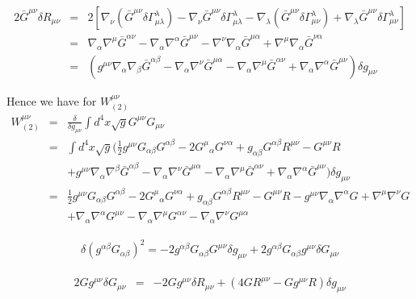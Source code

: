\documentclass[10pt,letterpaper]{article}
\numberwithin{equation}{section}
\begin{document}
\begin{appendices}
\begin{eqnarray}
2\bar G^{\mu\nu}\delta R_{\mu\nu} &=& 2 \left[ \nabla_\nu (\bar G^{\mu\nu}\delta \Gamma^\lambda_{\mu\lambda}) - \nabla_\nu \bar G^{\mu\nu} \delta \Gamma^\lambda_{\mu\lambda}
-\nabla_\lambda (\bar G^{\mu\nu}\delta \Gamma^\lambda_{\mu\nu}) + \nabla_\lambda \bar G^{\mu\nu} \delta \Gamma^\lambda_{\mu\nu}\right]
\nonumber\\
&=& \nabla_\alpha \nabla^\mu \bar G^{\alpha\nu} - \nabla_\alpha\nabla^\alpha \bar G^{\mu\nu}
-\nabla^\nu \nabla_\alpha \bar G^{\mu\alpha} + \nabla^\mu \nabla_\alpha \bar G^{\nu\alpha}
\nonumber\\
&=& \left( g^{\mu\nu} \nabla_\alpha\nabla_\beta \bar G^{\alpha\beta} - \nabla_\alpha \nabla^\nu \bar G^{\mu\alpha} - \nabla_\alpha \nabla^\mu \bar G^{\alpha\nu} + \nabla_\alpha\nabla^\alpha \bar G^{\mu\nu}\right)\delta g_{\mu\nu}
\end{eqnarray}

Hence we have for $W_{(2)}^{\mu\nu}$
\begin{eqnarray}
W_{(2)}^{\mu\nu} &=& \frac{\delta}{\delta g_{\mu\nu}} \int d^4x \sqrt g G^{\mu\nu} G_{\mu\nu} 
\nonumber\\
 &=&\int d^4x \sqrt g \bigg( \frac12 g^{\mu\nu} G_{\alpha\beta}G^{\alpha\beta}
-2G^{\mu}{}_\alpha G^{\nu\alpha} +g_{\alpha\beta}G^{\alpha\beta}R^{\mu\nu}-G^{\mu\nu} R
\nonumber\\
&&
+g^{\mu\nu} \nabla_\alpha\nabla^\beta \bar G^{\alpha\beta} - \nabla_\alpha \nabla^\nu \bar G^{\mu\alpha} - \nabla_\alpha \nabla^\mu \bar G^{\alpha\nu} + \nabla_\alpha\nabla^\alpha \bar G^{\mu\nu}\bigg)
\delta g_{\mu\nu}
\nonumber\\
&=&  \frac12 g^{\mu\nu} G_{\alpha\beta}G^{\alpha\beta}
-2G^{\mu}{}_\alpha G^{\nu\alpha} +g_{\alpha\beta}G^{\alpha\beta}R^{\mu\nu}-G^{\mu\nu} R - g^{\mu\nu} \nabla_\alpha \nabla^\alpha G + \nabla^\mu \nabla^\nu G
\nonumber\\
&& + \nabla_\alpha\nabla^\alpha G^{\mu\nu} - \nabla_\alpha \nabla^\mu G^{\alpha\nu} - \nabla_\alpha\nabla^\nu G^{\mu\alpha}
\end{eqnarray}

\begin{eqnarray}
\delta (g^{\alpha\beta}G_{\alpha\beta})^2 = -2g^{\alpha\beta}G_{\alpha\beta} G^{\mu\nu} \delta g_{\mu\nu} +2g^{\alpha\beta}G_{\alpha\beta}  g^{\mu\nu} \delta G_{\mu\nu} 
\end{eqnarray}

\begin{eqnarray}
2 G  g^{\mu\nu} \delta G_{\mu\nu} &=& 
-2 G  g^{\mu\nu}\delta R_{\mu\nu} +( 4G R^{\mu\nu}-G g^{\mu\nu} R) \delta g_{\mu\nu}
\end{eqnarray}


\end{appendices}
\end{document}
